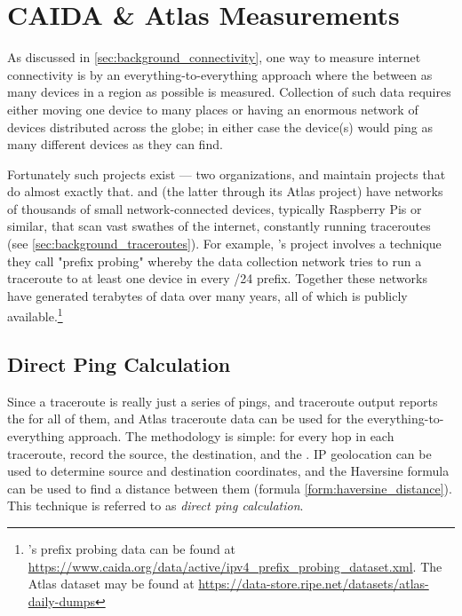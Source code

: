 \section{CAIDA \& Atlas Measurements}\label{sec:design_caida}

As discussed in \autoref{sec:background_connectivity}, one way to measure internet connectivity is by an everything-to-everything approach where the \rtt between as many devices in a region as possible is measured. Collection of such data requires either moving one device to many places or having an enormous network of devices distributed across the globe; in either case the device(s) would ping as many different devices as they can find.

Fortunately such projects exist --- two organizations, \caida and \ripe maintain projects that do almost exactly that. \caida and \ripe (the latter through its Atlas project) have networks of thousands of small network-connected devices, typically Raspberry Pis or similar, that scan vast swathes of the internet, constantly running \gls{traceroute}s (see \autoref{sec:background_traceroutes}). For example, \caida's project involves a technique they call "prefix probing" whereby the \caida data collection network tries to run a \gls{traceroute} to at least one device in every /24 prefix. Together these networks have generated terabytes of data over many years, all of which is publicly available.\footnote{\CAIDA's prefix probing data can be found at \url{https://www.caida.org/data/active/ipv4_prefix_probing_dataset.xml}. The \ripe Atlas dataset may be found at \url{https://data-store.ripe.net/datasets/atlas-daily-dumps}}

\subsection{Direct Ping Calculation}

Since a \gls{traceroute} is really just a series of pings, and traceroute output reports the \rtts for all of them, \caida and \ripe Atlas traceroute data can be used for the everything-to-everything \rtt approach. The methodology is simple: for every hop in each traceroute, record the source, the destination, and the \rtt. IP geolocation can be used to determine source and destination coordinates, and the Haversine formula can be used to find a distance between them (formula \ref{form:haversine_distance}). This technique is referred to as \textit{direct ping calculation}.

